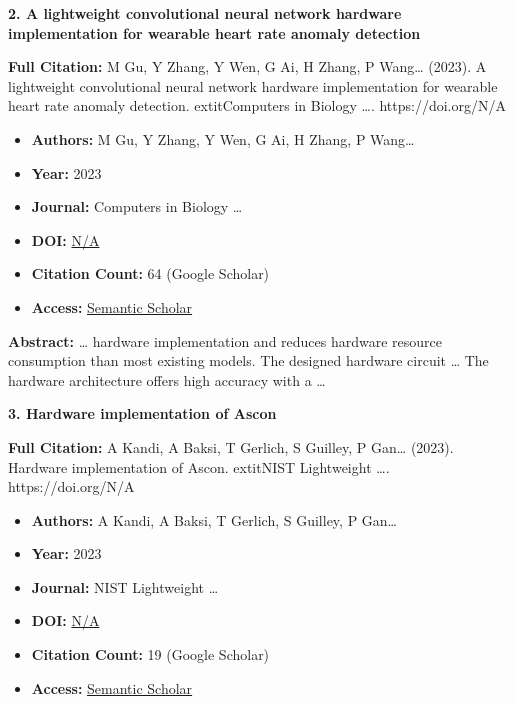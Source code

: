 \documentclass[11pt,a4paper]{article}
\begin{document}
\textbf{2. A lightweight convolutional neural network hardware implementation for wearable heart rate anomaly detection}

\textbf{Full Citation:} M Gu, Y Zhang, Y Wen, G Ai, H Zhang, P Wang… (2023). A lightweight convolutional neural network hardware implementation for wearable heart rate anomaly detection. 	extit{Computers in Biology …}. https://doi.org/N/A

\begin{resultbox}
\begin{itemize}[leftmargin=*]
    \item \textbf{Authors:} M Gu, Y Zhang, Y Wen, G Ai, H Zhang, P Wang…
    \item \textbf{Year:} 2023
    \item \textbf{Journal:} Computers in Biology …
    
    
    
    \item \textbf{DOI:} \href{https://doi.org/}{N/A}
    \item \textbf{Citation Count:} 64 (Google Scholar)
    \item \textbf{Access:} \href{https://www.sciencedirect.com/science/article/pii/S0010482523000884}{Semantic Scholar}
\end{itemize}
\end{resultbox}

\textbf{Abstract:} … hardware implementation and reduces hardware resource consumption than most existing models. The designed hardware circuit … The hardware architecture offers high accuracy with a …\par\vspace{0.5em}



\textbf{3. Hardware implementation of Ascon}

\textbf{Full Citation:} A Kandi, A Baksi, T Gerlich, S Guilley, P Gan… (2023). Hardware implementation of Ascon. 	extit{NIST Lightweight …}. https://doi.org/N/A

\begin{resultbox}
\begin{itemize}[leftmargin=*]
    \item \textbf{Authors:} A Kandi, A Baksi, T Gerlich, S Guilley, P Gan…
    \item \textbf{Year:} 2023
    \item \textbf{Journal:} NIST Lightweight …
    
    
    
    \item \textbf{DOI:} \href{https://doi.org/}{N/A}
    \item \textbf{Citation Count:} 19 (Google Scholar)
    \item \textbf{Access:} \href{https://csrc.nist.gov/csrc/media/events/2023/lightweight-cryptography-workshop-2023/documents/accepted-papers/07-hardware-implementation-of-ascon.pdf}{Semantic Scholar}
\end{itemize}
\end{resultbox}
\end{document}
